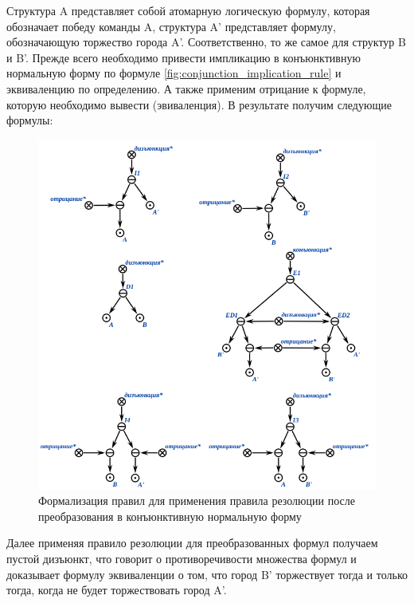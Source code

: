 Структура A представляет собой атомарную логическую формулу, которая обозначает победу команды A, структура A' представляет формулу, обозначающую торжество города A'. Соответственно, то же самое для структур B и B'.
Прежде всего необходимо привести импликацию в конъюнктивную нормальную форму по формуле \ref{fig:conjunction_implication_rule} и эквиваленцию по определению. А также применим отрицание к формуле, которую необходимо вывести (эвиваленция). В результате получим следующие формулы:

\begin{figure}[H]
	\includegraphics[scale=0.8]{author/part3/figures/resolution_prepared_formulas_example.png}
	\caption{Формализация правил для применения правила резолюции после преобразования в конъюнктивную нормальную форму}
	\label{fig:resolution_formulas}
\end{figure}

Далее применяя правило резолюции для преобразованных формул получаем пустой дизъюнкт, что говорит о противоречивости множества формул и доказывает формулу эквиваленции о том, что город B' торжествует тогда и только тогда, когда не будет торжествовать город A'.

